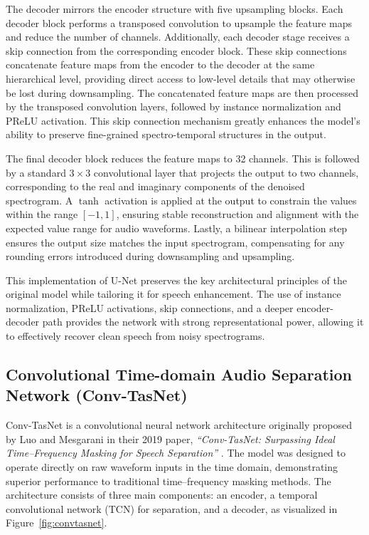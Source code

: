 The decoder mirrors the encoder structure with five upsampling blocks. Each decoder block performs a transposed convolution to upsample the feature maps and reduce the number of channels. Additionally, each decoder stage receives a skip connection from the corresponding encoder block. These skip connections concatenate feature maps from the encoder to the decoder at the same hierarchical level, providing direct access to low-level details that may otherwise be lost during downsampling. The concatenated feature maps are then processed by the transposed convolution layers, followed by instance normalization and PReLU activation. This skip connection mechanism greatly enhances the model’s ability to preserve fine-grained spectro-temporal structures in the output.

The final decoder block reduces the feature maps to 32 channels. This is followed by a standard $3 \times 3$ convolutional layer that projects the output to two channels, corresponding to the real and imaginary components of the denoised spectrogram. A $\tanh$ activation is applied at the output to constrain the values within the range \([-1, 1]\), ensuring stable reconstruction and alignment with the expected value range for audio waveforms. Lastly, a bilinear interpolation step ensures the output size matches the input spectrogram, compensating for any rounding errors introduced during downsampling and upsampling.

This implementation of U-Net preserves the key architectural principles of the original model while tailoring it for speech enhancement. The use of instance normalization, PReLU activations, skip connections, and a deeper encoder-decoder path provides the network with strong representational power, allowing it to effectively recover clean speech from noisy spectrograms.

\subsection{Convolutional Time-domain Audio Separation Network (Conv-TasNet)}

Conv-TasNet is a convolutional neural network architecture originally proposed by Luo and Mesgarani in their 2019 paper, \textit{``Conv-TasNet: Surpassing Ideal Time--Frequency Masking for Speech Separation''} \cite{luo2019conv}. The model was designed to operate directly on raw waveform inputs in the time domain, demonstrating superior performance to traditional time--frequency masking methods. The architecture consists of three main components: an encoder, a temporal convolutional network (TCN) for separation, and a decoder, as visualized in Figure~\ref{fig:convtasnet}.

